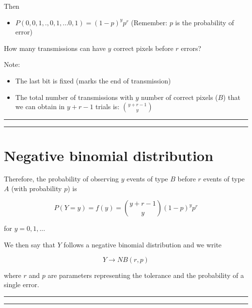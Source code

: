 \documentclass[
]{book}
\providecommand{\tightlist}{%
  \setlength{\itemsep}{0pt}\setlength{\parskip}{0pt}}
\begin{document}
Then

\begin{itemize}
\tightlist
\item
  \(P(0,0,1,., 0,1,...0,1)=(1-p)^yp^r\) (Remember: \(p\) is the probability of error)
\end{itemize}

How many transmissions can have \(y\) correct pixels before \(r\) errors?

Note:

\begin{itemize}
\item
  The last bit is fixed (marks the end of transmission)
\item
  The total number of transmissions with \(y\) number of correct pixels (\(B\)) that we can obtain in \(y + r-1\) trials is: \(\binom {y + r-1} y\)
\end{itemize}

\begin{center}\rule{0.5\linewidth}{0.5pt}\end{center}

\begin{center}\rule{0.5\linewidth}{0.5pt}\end{center}

\hypertarget{negative-binomial-distribution-2}{%
\section{Negative binomial distribution}\label{negative-binomial-distribution-2}}

Therefore, the probability of observing \(y\) events of type \(B\) before \(r\) events of type \(A\) (with probability \(p\)) is

\[P(Y=y)=f(y)=\binom {y+r-1} y (1-p)^yp^r\]

for \(y=0,1,...\)

We then say that \(Y\) follows a negative binomial distribution and we write

\[Y\rightarrow NB(r,p)\]

where \(r\) and \(p\) are parameters representing the tolerance and the probability of a single error.

\begin{center}\rule{0.5\linewidth}{0.5pt}\end{center}

\begin{center}\rule{0.5\linewidth}{0.5pt}\end{center}
\end{document}

